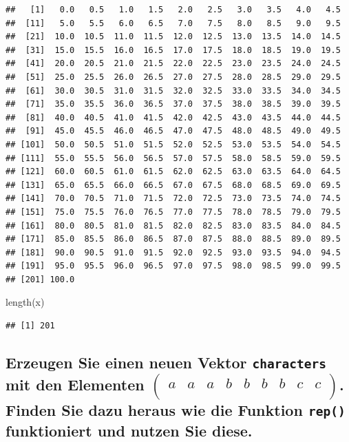 \documentclass[12pt,a4paper]{article}
\newenvironment{Shaded}{\begin{snugshade}}{\end{snugshade}}
\newcommand{\FunctionTok}[1]{\textcolor[rgb]{0.00,0.00,0.00}{#1}}
\newcommand{\NormalTok}[1]{#1}
\begin{document}
\begin{verbatim}
##   [1]   0.0   0.5   1.0   1.5   2.0   2.5   3.0   3.5   4.0   4.5
##  [11]   5.0   5.5   6.0   6.5   7.0   7.5   8.0   8.5   9.0   9.5
##  [21]  10.0  10.5  11.0  11.5  12.0  12.5  13.0  13.5  14.0  14.5
##  [31]  15.0  15.5  16.0  16.5  17.0  17.5  18.0  18.5  19.0  19.5
##  [41]  20.0  20.5  21.0  21.5  22.0  22.5  23.0  23.5  24.0  24.5
##  [51]  25.0  25.5  26.0  26.5  27.0  27.5  28.0  28.5  29.0  29.5
##  [61]  30.0  30.5  31.0  31.5  32.0  32.5  33.0  33.5  34.0  34.5
##  [71]  35.0  35.5  36.0  36.5  37.0  37.5  38.0  38.5  39.0  39.5
##  [81]  40.0  40.5  41.0  41.5  42.0  42.5  43.0  43.5  44.0  44.5
##  [91]  45.0  45.5  46.0  46.5  47.0  47.5  48.0  48.5  49.0  49.5
## [101]  50.0  50.5  51.0  51.5  52.0  52.5  53.0  53.5  54.0  54.5
## [111]  55.0  55.5  56.0  56.5  57.0  57.5  58.0  58.5  59.0  59.5
## [121]  60.0  60.5  61.0  61.5  62.0  62.5  63.0  63.5  64.0  64.5
## [131]  65.0  65.5  66.0  66.5  67.0  67.5  68.0  68.5  69.0  69.5
## [141]  70.0  70.5  71.0  71.5  72.0  72.5  73.0  73.5  74.0  74.5
## [151]  75.0  75.5  76.0  76.5  77.0  77.5  78.0  78.5  79.0  79.5
## [161]  80.0  80.5  81.0  81.5  82.0  82.5  83.0  83.5  84.0  84.5
## [171]  85.0  85.5  86.0  86.5  87.0  87.5  88.0  88.5  89.0  89.5
## [181]  90.0  90.5  91.0  91.5  92.0  92.5  93.0  93.5  94.0  94.5
## [191]  95.0  95.5  96.0  96.5  97.0  97.5  98.0  98.5  99.0  99.5
## [201] 100.0
\end{verbatim}

\begin{Shaded}
\begin{Highlighting}[]
    \FunctionTok{length}\NormalTok{(x)}
\end{Highlighting}
\end{Shaded}

\begin{verbatim}
## [1] 201
\end{verbatim}

\vspace{0.5cm}

\hypertarget{erzeugen-sie-einen-neuen-vektor-mit-den-elementen-beginpmatrix-a-a-a-b-b-b-b-c-c-endpmatrix.-finden-sie-dazu-heraus-wie-die-funktion-funktioniert-und-nutzen-sie-diese.}{%
\subsection{\texorpdfstring{Erzeugen Sie einen neuen Vektor
\texttt{characters} mit den Elementen
\(\begin{pmatrix} a & a & a & b & b & b & b & c & c \\ \end{pmatrix}\).
Finden Sie dazu heraus wie die Funktion \texttt{rep()} funktioniert und
nutzen Sie
diese.}{Erzeugen Sie einen neuen Vektor  mit den Elementen \textbackslash begin\{pmatrix\} a \& a \& a \& b \& b \& b \& b \& c \& c \textbackslash\textbackslash{} \textbackslash end\{pmatrix\}. Finden Sie dazu heraus wie die Funktion  funktioniert und nutzen Sie diese.}}\label{erzeugen-sie-einen-neuen-vektor-mit-den-elementen-beginpmatrix-a-a-a-b-b-b-b-c-c-endpmatrix.-finden-sie-dazu-heraus-wie-die-funktion-funktioniert-und-nutzen-sie-diese.}}
\end{document}
